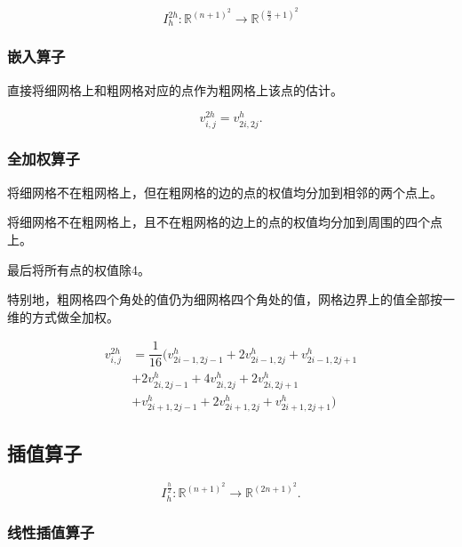 \documentclass{ctexart}
\begin{document}
\begin{equation}
	I_{h}^{2h} : \mathbb{R}^{(n+1)^2} \rightarrow \mathbb{R}^{(\frac n2+1)^2}
\end{equation}

\subsubsection{嵌入算子}

直接将细网格上和粗网格对应的点作为粗网格上该点的估计。

\begin{equation}
	v_{i,j}^{2h} = v_{2i,2j}^h.
\end{equation}

\subsubsection{全加权算子}

将细网格不在粗网格上，但在粗网格的边的点的权值均分加到相邻的两个点上。

将细网格不在粗网格上，且不在粗网格的边上的点的权值均分加到周围的四个点上。

最后将所有点的权值除4。

特别地，粗网格四个角处的值仍为细网格四个角处的值，网格边界上的值全部按一维的方式做全加权。

\begin{equation}
\begin{split}
	v_{i,j}^{2h}
	& = \dfrac 1{16}(v_{2i-1,2j-1}^h + 2v_{2i-1,2j}^h + v_{2i-1,2j+1}^h\\
	& + 2v_{2i,2j-1}^h + 4v_{2i,2j}^h + 2v_{2i,2j+1}^h\\
	& + v_{2i+1,2j-1}^h + 2v_{2i+1,2j}^h + v_{2i+1,2j+1}^h)
\end{split}
\end{equation}

\subsection{插值算子}

\begin{equation}
	I_h^{\frac h2} : \mathbb{R}^{(n+1)^2} \rightarrow \mathbb{R}^{(2n+1)^2}.
\end{equation}

\subsubsection{线性插值算子}
\end{document}
